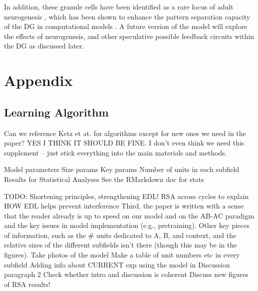 \documentclass[11pt,twoside]{article}
\newif\myifpdf
\begin{document}
In addition, these granule cells have been identified as a rare locus of adult neurogenesis \citep{neurogenesis}, which has been shown to enhance the pattern separation capacity of the DG in computational models \citep{Becker}.  A future version of the model will explore the effects of neurogenesis, and other speculative possible feedback circuits within the DG as discussed later.

\section{Appendix}

\subsection{Learning Algorithm}

Can we reference Ketz et at. for algorithms except for new ones we need in the paper? YES I THINK IT SHOULD BE FINE.  I don't even think we need this supplement -- just stick everything into the main materials and methods.

Model parameters
Size params
Key params
Number of units in each subfield
Results for Statistical Analyses
See the RMarkdown doc for stats


TODO:
Shortening principles, strengthening EDL!
RSA across cycles to explain HOW EDL helps prevent interference 
Third, the paper is written with a sense that the reader already is up to speed on our model and on the AB-AC paradigm and the key issues in model implementation (e.g., pretraining). Other key pieces of information, such as the \# units dedicated to A, B, and context, and the relative sizes of the different subfields isn't there (though this may be in the figures).  
Take photos of the model
Make a table of unit numbers etc in every subfield
Adding info about CURRENT exp using the model in Discussion paragraph 2
Check whether intro and discussion is coherent
Discuss new figures of RSA results!

%

\end{document}
